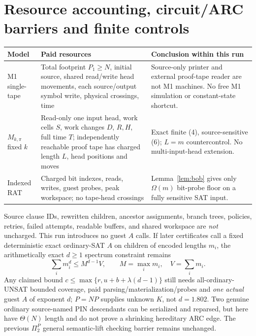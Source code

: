 \documentclass[11pt]{article}
\begin{document}
\section{Resource accounting, circuit/ARC barriers and finite controls}
\begin{center}
\begin{tabular}{p{.15\linewidth}p{.35\linewidth}p{.40\linewidth}}
\toprule
Model & Paid resources & Conclusion within this run\\
\midrule
M1 single-tape & Total footprint $P_1\ge N$, initial source, shared read/write head movements, each source/output symbol write, physical crossings, time & Source-only printer and external proof-tape reader are not M1 machines. No free M1 simulation or constant-state shortcut.\\
$M_{k,\pi}$ fixed $k$ & Read-only one input head, work cells $S$, work changes $D$, $R,H$, full time $T$; independently reachable proof tape has charged length $L$, head positions and moves & Exact finite (4), source-sensitive (6); $L=m$ countercontrol. No multi-input-head extension.\\
Indexed RAT & Charged bit indexes, reads, writes, guest probes, peak workspace; no tape-head crossings & Lemma~\ref{lem:bob} gives only $\Omega(m)$ bit-probe floor on a fully sensitive SAT input.\\
\bottomrule
\end{tabular}
\end{center}
Source clause IDs, rewritten children, ancestor assignments, branch trees, policies, retries, failed attempts, readable buffers, and shared workspace are \emph{not} uncharged. This run introduces no guest $A$ calls. If later certificates call a fixed deterministic exact ordinary-SAT $A$ on children of encoded lengths $m_i$, the arithmetically exact $d\ge1$ spectrum constraint remains
\[
\sum_i m_i^d\le M^{d-1}V,\qquad M=\max_i m_i,\quad V=\sum_i m_i.
\]
Any claimed bound $c\le\max\{r,u+b+\lambda(d-1)\}$ still needs all-ordinary-UNSAT bounded coverage, paid parsing/materialization/probes and \emph{one actual} guest $A$ of exponent $d$; $P=NP$ supplies unknown $K$, not $d=1.802$. Two genuine ordinary source-named PIN descendants can be serialized and reparsed, but here have $\Theta(N)$ length and do not prove a shrinking hereditary ARC edge. The previous $\Pi_2^P$ general semantic-lift checking barrier remains unchanged.
\end{document}
